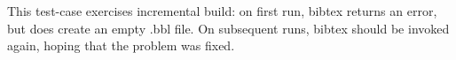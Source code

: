 \documentclass{article}
\begin{document}
This  test-case  exercises incremental  build:  on  first run,  bibtex
returns an  error, but does create  an empty .bbl file.  On subsequent
runs,  bibtex should  be invoked  again, hoping  that the  problem was
fixed. 

\nocite{*}



\end{document}
